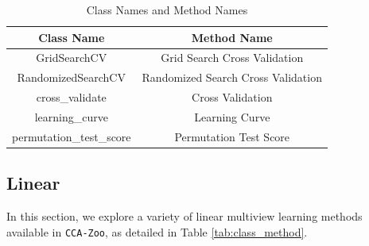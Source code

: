 \begin{table}[ht]
    \centering
    \begin{tabular}{|c|c|}
        \hline
        Class Name & Method Name \\
        \hline
        GridSearchCV & Grid Search Cross Validation \\
        RandomizedSearchCV & Randomized Search Cross Validation \\
        cross\_validate & Cross Validation \\
        learning\_curve & Learning Curve \\
        permutation\_test\_score & Permutation Test Score \\
        \hline
    \end{tabular}
    \caption{Class Names and Method Names}\label{tab:class_method_5}
\end{table}

\subsection{Linear}
In this section, we explore a variety of linear multiview learning methods available in \texttt{CCA-Zoo}, as detailed in Table \ref{tab:class_method}.


